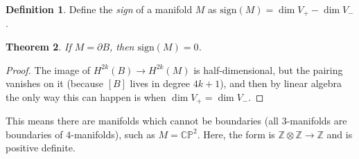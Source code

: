 \documentclass[leqno, openany]{memoir}
\newtheorem{thm}{Theorem}[section]
\theoremstyle{definition}
\newtheorem{defn}[thm]{Definition}
\theoremstyle{remark}
\theoremstyle{plain}
\theoremstyle{definition}
\theoremstyle{remark}
\newcommand{\C}{\mathbb{C}}
\newcommand{\Z}{\mathbb{Z}}
\renewcommand{\P}{\mathbb{P}}
\newcommand{\mr}[1]{\mathrm{#1}}
\begin{document}
\begin{defn}
    Define the \textit{sign} of a manifold $M$ as $\mr{sign}(M) = \dim V_+ - \dim V_-$. 
\end{defn}

\begin{thm}
    If $M = \partial B$, then $\mr{sign}(M) = 0$.
\end{thm}

\begin{proof}
    The image of $H^{2k}(B) \to H^{2k}(M)$ is half-dimensional, but the pairing vanishes on it (because $[B]$ lives in degree $4k+1$), and then by linear algebra the only way this can happen is when $\dim V_+ = \dim V_-$.
\end{proof}

This means there are manifolds which cannot be boundaries (all $3$-manifolds are boundaries of $4$-manifolds), such as $M = \C\P^2$. Here, the form is $\Z \otimes \Z \to \Z$ and is positive definite.
\end{document}

